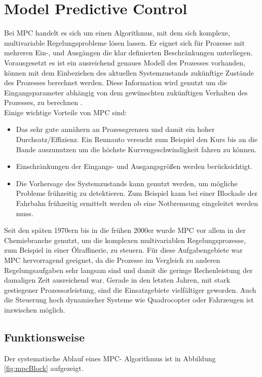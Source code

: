 \documentclass{like}
\begin{document}
\section{Model Predictive Control}
Bei \ac{MPC} handelt es sich um einen Algorithmus, mit dem sich komplexe, multivariable Regelungsprobleme lösen lassen. Er eignet sich für Prozesse mit mehreren Ein-, und Ausgängen die klar definierten Beschränkungen unterliegen. Vorausgesetzt es ist ein ausreichend genaues Modell des Prozesses vorhanden, können mit dem Einbeziehen des aktuellen Systemzustands zukünftige Zustände des Prozesses berechnet werden. Diese Information wird genutzt um die Eingangsparameter abhängig von dem gewünschten zukünftigen Verhalten des Prozesses, zu berechnen \cite{seborg2010process}. \\
Einige wichtige Vorteile von \ac{MPC} sind: 
\begin{itemize}
	\item Das sehr gute annähern an Prozessgrenzen und damit ein hoher Durchsatz/Effizienz. Ein Rennauto versucht zum Beispiel den Kurs bis an die Bande auszunutzen um die höchste Kurvengeschwindigkeit fahren zu können.
	\item Einschränkungen der Eingangs- und Ausgangsgrößen werden berücksichtigt.
	\item Die Vorhersage des Systemzustands kann genutzt werden, um mögliche Probleme frühzeitig zu detektieren. Zum Beispiel kann bei einer Blockade der Fahrbahn frühzeitig ermittelt werden ob eine Notbremsung eingeleitet werden muss.
\end{itemize}
Seit den späten 1970ern bis in die frühen 2000er wurde \ac{MPC} vor allem in der Chemiebranche genutzt, um die komplexen multivariablen Regelungsprozesse, zum Beispiel in einer Ölraffinerie, zu steuern. Für diese Aufgabengebiete war \ac{MPC} hervorragend geeignet, da die Prozesse im Vergleich zu anderen Regelungsaufgaben sehr langsam sind und damit die geringe Rechenleistung der damaligen Zeit ausreichend war. 
Gerade in den letzten Jahren, mit stark gestiegener Prozessorleistung, sind die Einsatzgebiete vielfältiger geworden. Auch die Steuerung hoch dynamischer Systeme wie Quadrocopter \cite{quadcopterMpc} oder Fahrzeugen \cite{carMPC} ist inzwischen möglich. 

\subsection*{Funktionsweise}
Der systematische Ablauf eines \ac{MPC}- Algorithmus ist in Abbildung \ref{fig:mpcBlock} aufgezeigt.  
\end{document}
